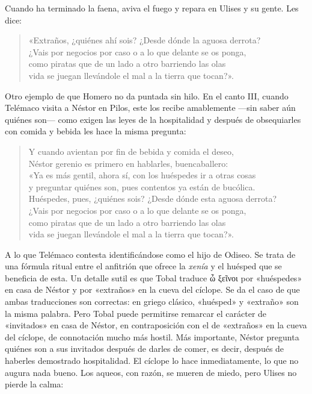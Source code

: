\documentclass[11pt,a4paper]{article}
\newcommand{\gr}[1]{\foreignlanguage{greek}{#1}}
\begin{document}
Cuando ha terminado la faena, aviva el fuego y repara en Ulises y su gente. Les dice:

\begin{verse}
«Extraños, ¿quiénes ahí sois? ¿Desde dónde la aguosa derrota?\\
¿Vais por negocios por caso o a lo que delante se os ponga,\\
como piratas que de un lado a otro barriendo las olas\\
vida se juegan llevándole el mal a la tierra que tocan?».
\end{verse}

Otro ejemplo de que Homero no da puntada sin hilo. En el canto III, cuando Telémaco visita a Néstor en Pilos, este los recibe amablemente ---sin saber aún quiénes son--- como exigen las leyes de la hospitalidad y después de obsequiarles con comida y bebida les hace la misma pregunta:

\begin{verse}
Y cuando avientan por fin de bebida y comida el deseo,\\
Néstor gerenio es primero en hablarles, buencaballero:\\
«Ya es más gentil, ahora sí, con los huéspedes ir a otras cosas\\
y preguntar quiénes son, pues contentos ya están de bucólica.\\
Huéspedes, pues, ¿quiénes sois? ¿Desde dónde esta aguosa derrota?\\
¿Vais por negocios por caso o a lo que delante se os ponga,\\
como piratas que de un lado a otro barriendo las olas\\
vida se juegan llevándole el mal a la tierra que tocan?».
\end{verse}

A lo que Telémaco contesta identificándose como el hijo de Odiseo. Se trata de una fórmula ritual entre el anfitrión que ofrece la \emph{xenía} y el huésped que se beneficia de esta. Un detalle sutil es que Tobal traduce \gr{ὦ ξεῖνοι} por «huéspedes» en casa de Néstor y por «extraños» en la cueva del cíclope. Se da el caso de que ambas traducciones son correctas: en griego clásico, «huésped» y «extraño» son la misma palabra. Pero Tobal puede permitirse remarcar el carácter de «invitados» en casa de Néstor, en contraposición con el de «extraños» en la cueva del cíclope, de connotación mucho más hostil. Más importante, Néstor pregunta quiénes son a sus invitados después de darles de comer, es decir, después de haberles demostrado hospitalidad. El cíclope lo hace inmediatamente, lo que no augura nada bueno. Los aqueos, con razón, se mueren de miedo, pero Ulises no pierde la calma:
\end{document}
